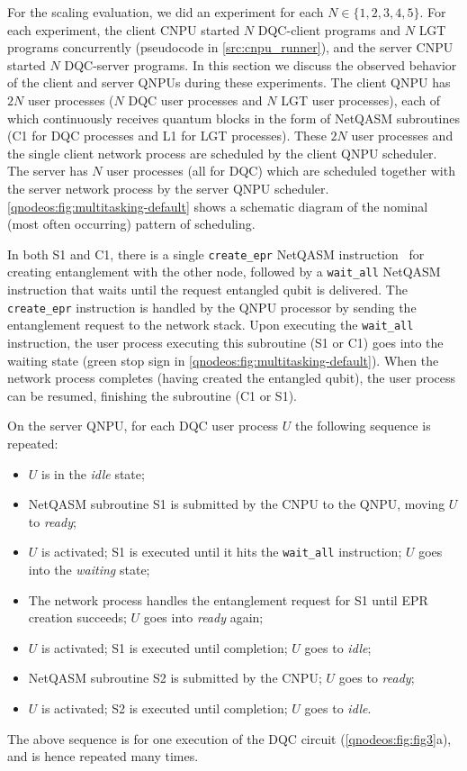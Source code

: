 For the scaling evaluation, we did an experiment for each $N \in \{1, 2, 3, 4, 5\}$. For each experiment, the client \ac{CNPU} started $N$ \ac{DQC}-client programs and $N$ \ac{LGT} programs concurrently (pseudocode in \cref{src:cnpu_runner}), and the server \ac{CNPU} started $N$ \ac{DQC}-server programs. In this section we discuss the observed behavior of the client and server \acp{QNPU} during these experiments. The client \ac{QNPU} has $2N$ user processes ($N$ \ac{DQC} user processes and $N$ LGT user processes), each of which continuously receives quantum blocks in the form of \ac{NetQASM} subroutines (C1 for \ac{DQC} processes and L1 for \ac{LGT} processes). These $2N$ user processes and the single client network process are scheduled by the client \ac{QNPU} scheduler. The server has $N$ user processes (all for \ac{DQC}) which are scheduled together with the server network process by the server \ac{QNPU} scheduler. \cref{qnodeos:fig:multitasking-default} shows a schematic diagram of the nominal (most often occurring) pattern of scheduling.

In both S1 and C1, there is a single \texttt{create\_epr} \ac{NetQASM} instruction~\cite{dahlberg_2022_netqasm} for creating entanglement with the other node, followed by a \texttt{wait\_all} \ac{NetQASM} instruction that waits until the request entangled qubit is delivered. The \texttt{create\_epr} instruction is handled by the \ac{QNPU} processor by sending the entanglement request to the network stack. Upon executing the \texttt{wait\_all} instruction, the user process executing this subroutine (S1 or C1) goes into the waiting state (green stop sign in \cref{qnodeos:fig:multitasking-default}). When the network process completes (having created the entangled qubit), the user process can be resumed, finishing the subroutine (C1 or S1). 

On the server \ac{QNPU}, for each \ac{DQC} user process $U$ the following sequence is repeated:
%
\begin{itemize}
    \item $U$ is in the \textit{idle} state;
    \item \ac{NetQASM} subroutine S1 is submitted by the \ac{CNPU} to the \ac{QNPU}, moving $U$ to \textit{ready};
    \item $U$ is activated; S1 is executed until it hits the \texttt{wait\_all} instruction; $U$ goes into the \textit{waiting} state;
    \item The network process handles the entanglement request for S1 until \ac{EPR} creation succeeds; $U$ goes into \textit{ready} again;
    \item $U$ is activated; S1 is executed until completion; $U$ goes to \textit{idle};
    \item \ac{NetQASM} subroutine S2 is submitted by the \ac{CNPU}; $U$ goes to \textit{ready};
    \item $U$ is activated; S2 is executed until completion; $U$ goes to \textit{idle}.
\end{itemize}
%
The above sequence is for one execution of the \ac{DQC} circuit (\cref{qnodeos:fig:fig3}a), and is hence repeated many times.

